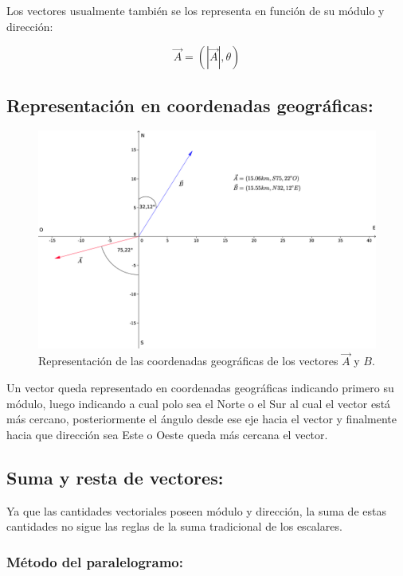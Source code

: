 Los vectores usualmente también se los representa en función de su módulo y dirección:

\begin{equation}
 \vec{A} = (|\vec{A}|, \theta)
\end{equation}

\subsection{Representación en coordenadas geográficas:}

\begin{figure}
 \centering
 \includegraphics[width=1.1\textwidth]{images/vector_cuatro.eps}
   \caption{\small{Representación de las coordenadas geográficas de los vectores $\vec{A}$ y $B$.}}
\end{figure}

Un vector queda representado en coordenadas geográficas indicando primero su módulo, luego indicando a cual polo sea el 
Norte o el Sur al cual el vector está más cercano, posteriormente el ángulo desde ese eje hacia el vector y finalmente 
hacia que dirección sea Este o Oeste queda más cercana el vector.

\subsection{Suma y resta de vectores:}

Ya que las cantidades vectoriales poseen módulo y dirección, la suma de estas cantidades no sigue las reglas de la suma 
tradicional de los escalares.

\subsubsection{Método del paralelogramo:}

